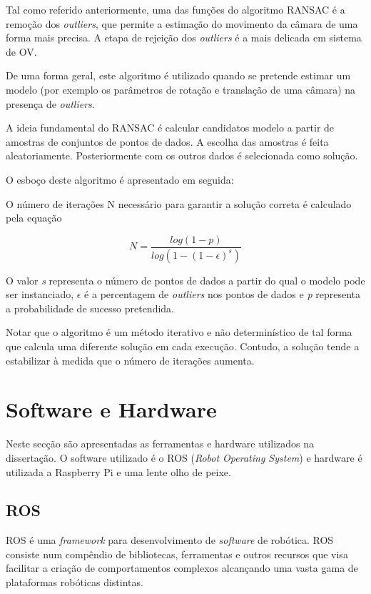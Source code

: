 Tal como referido anteriormente, uma das funções do algoritmo RANSAC é a remoção dos \textit{outliers}, que permite a estimação do movimento da câmara de uma forma mais precisa. A etapa de rejeição dos \textit{outliers} é a mais delicada em sistema de OV.

De uma forma geral, este algoritmo é utilizado quando se pretende estimar um modelo (por exemplo os parâmetros de rotação e translação de uma câmara) na presença de \textit{outliers}.

A ideia fundamental do RANSAC é calcular candidatos modelo a partir de amostras de conjuntos de pontos de dados. A escolha das amostras é feita aleatoriamente. Posteriormente com os outros dados é selecionada como solução.

O esboço deste algoritmo é apresentado em seguida:


O número de iterações N necessário para garantir a solução correta é calculado pela equação

\[  N = \frac{log(1-p)}{log(1-(1-\epsilon)^s)} \]

O valor \textit{s} representa o número de pontos de dados a partir do qual o modelo pode ser instanciado, $\epsilon$ é a percentagem de \textit{outliers} nos pontos de dados e \textit{p} representa a probabilidade de sucesso pretendida.

Notar que o algoritmo é um método iterativo e não determinístico de tal forma que calcula uma diferente solução em cada execução. Contudo, a solução tende a estabilizar à medida que o número de iterações aumenta.




\section{Software e Hardware} \label{sec:ferSof}

Neste secção são apresentadas as ferramentas e hardware utilizados na dissertação. O software utilizado é o ROS (\textit{Robot Operating System}) e hardware é utilizada a Raspberry Pi e uma lente olho de peixe.

\subsection{ROS}

ROS  é uma \textit{framework} para desenvolvimento de \textit{software} de robótica. ROS consiste num compêndio de bibliotecas, ferramentas e outros recursos que visa facilitar a criação de comportamentos complexos alcançando uma vasta gama de plataformas robóticas distintas. 

